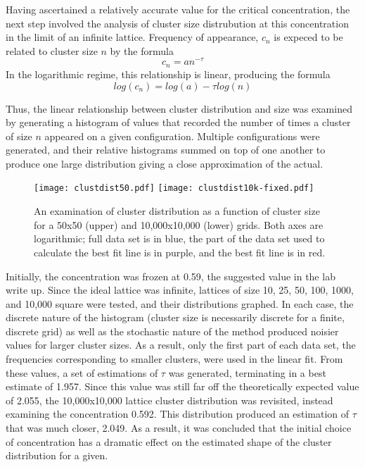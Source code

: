 \documentclass[twocolumn,prb,amsmath,amssymb,amsfonts]{revtex4}
\begin{document}
Having ascertained a relatively accurate value for the critical concentration, the next step involved the analysis of cluster size distrubution at this concentration in the limit of an infinite lattice. Frequency of appearance, $c_n$ is expeced to be related to cluster size $n$ by the formula
\begin{equation}
  c_n = an^{-\tau}
\end{equation}
In the logarithmic regime, this relationship is linear, producing the formula 
\begin{equation}
  log (c_n) = log(a)-\tau log(n)
\end{equation}

Thus, the linear relationship between cluster distribution and size was examined by generating a histogram of values that recorded the number of times a cluster of size $n$ appeared on a given configuration. Multiple configurations were generated, and their relative histograms summed on top of one another to produce one large distribution giving a close approximation of the actual.
\begin{figure}
\texttt{[image: clustdist50.pdf]}
\texttt{[image: clustdist10k-fixed.pdf]}
\caption{An examination of cluster distribution as a function of cluster size for a 50x50 (upper) and 10,000x10,000 (lower) grids. Both axes are logarithmic; full data set is in blue, the part of the data set used to calculate the best fit line is in purple, and the best fit line is in red.}
\end{figure}
Initially, the concentration was frozen at 0.59, the suggested value in the lab write up. Since the ideal lattice was infinite, lattices of size 10, 25, 50, 100, 1000, and 10,000 square were tested, and their distributions graphed. In each case, the discrete nature of the histogram (cluster size is necessarily discrete for a finite, discrete grid) as well as the stochastic nature of the method produced noisier values for larger cluster sizes. As a result, only the first part of each data set, the frequencies corresponding to smaller clusters, were used in the linear fit. From these values, a set of estimations of $\tau$ was generated, terminating in a best estimate of 1.957. Since this value was still far off the theoretically expected value of 2.055, the 10,000x10,000 lattice cluster distribution was revisited, instead examining the concentration 0.592. This distribution produced an estimation of $\tau$ that was much closer, 2.049. As a result, it was concluded that the initial choice of concentration has a dramatic effect on the estimated shape of the cluster distribution for a given. 
\end{document}
